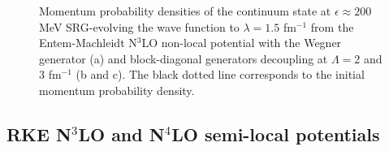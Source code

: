 \documentclass[preprintnumbers,floatfix,aps,prc,preprint,nofootinbib]{revtex4-1}
\begin{document}
\begin{figure}[H]
	\centering
	\quad
	\quad
	\caption{Momentum probability densities of the continuum state at $\epsilon \approx 200$ MeV SRG-evolving the wave function to $\lambda=1.5$ fm$^{-1}$ from the Entem-Machleidt N$^3$LO non-local potential with the Wegner generator (a) and block-diagonal generators decoupling at $\Lambda=2$ and $3$ fm$^{-1}$ (b and c). The black dotted line corresponds to the initial momentum probability density.}
	\label{continuum_state_momentum_distribution_eps200,0_kvnn10}
\end{figure}


\subsection{RKE N$^3$LO and N$^4$LO semi-local potentials}
\label{sec:semilocal_results}


\end{document}
